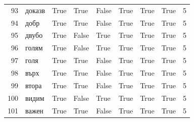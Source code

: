 \begin{longtable}{rlllllllr}
  93 &      доказв &     True &   True &  False &       True &           True &      True &      5 \\
  94 &        добр &     True &   True &  False &       True &           True &      True &      5 \\
  95 &       двубо &     True &  False &   True &       True &           True &      True &      5 \\
  96 &       голям &     True &  False &   True &       True &           True &      True &      5 \\
  97 &        голя &     True &   True &  False &       True &           True &      True &      5 \\
  98 &        върх &     True &   True &  False &       True &           True &      True &      5 \\
  99 &       втора &     True &   True &  False &       True &           True &      True &      5 \\
 100 &       видим &     True &  False &   True &       True &           True &      True &      5 \\
 101 &       важен &     True &   True &  False &       True &           True &      True &      5 \\
\end{longtable}
